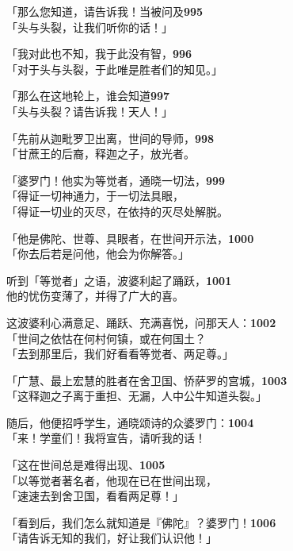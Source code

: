 「那么您知道，请告诉我！当被问及\hfill{\grayfootnotesize \textbf{995}} \\
「头与头裂，让我们听你的话！」


「我对此也不知，我于此没有智，\hfill{\grayfootnotesize \textbf{996}} \\
「对于头与头裂，于此唯是胜者们的知见。」

「那么在这地轮上，谁会知道\hfill{\grayfootnotesize \textbf{997}} \\
「头与头裂？请告诉我！天人！」

「先前从迦毗罗卫出离，世间的导师，\hfill{\grayfootnotesize \textbf{998}} \\
「甘蔗王的后裔，释迦之子，放光者。


「婆罗门！他实为等觉者，通晓一切法，\hfill{\grayfootnotesize \textbf{999}} \\
「得证一切神通力，于一切法具眼，\\
「得证一切业的灭尽，在依持的灭尽处解脱。


「他是佛陀、世尊、具眼者，在世间开示法，\hfill{\grayfootnotesize \textbf{1000}} \\
「你去后若是问他，他会为你解答。」

听到「等觉者」之语，波婆利起了踊跃，\hfill{\grayfootnotesize \textbf{1001}} \\
他的忧伤变薄了，并得了广大的喜。

这波婆利心满意足、踊跃、充满喜悦，问那天人：\hfill{\grayfootnotesize \textbf{1002}} \\
「世间之依怙在何村何镇，或在何国土？\\
「去到那里后，我们好看看等觉者、两足尊。」

「广慧、最上宏慧的胜者在舍卫国、㤭萨罗的宫城，\hfill{\grayfootnotesize \textbf{1003}} \\
「这释迦之子离于重担、无漏，人中公牛知道头裂。」


随后，他便招呼学生，通晓颂诗的众婆罗门：\hfill{\grayfootnotesize \textbf{1004}} \\
「来！学童们！我将宣告，请听我的话！


「这在世间总是难得出现、\hfill{\grayfootnotesize \textbf{1005}} \\
「以等觉者著名者，他现在已在世间出现，\\
「速速去到舍卫国，看看两足尊！」

「看到后，我们怎么就知道是『佛陀』？婆罗门！\hfill{\grayfootnotesize \textbf{1006}} \\
「请告诉无知的我们，好让我们认识他！」


